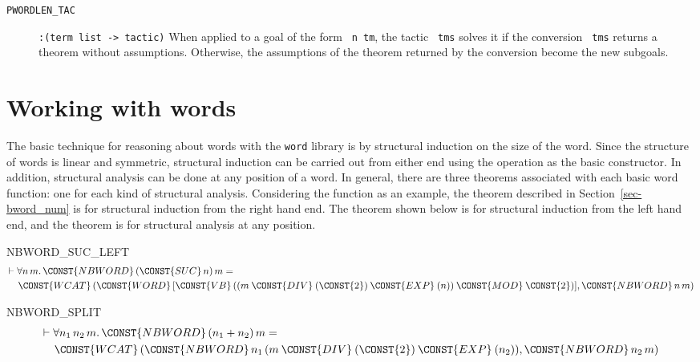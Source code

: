 \begin{description}
\item[{\tt PWORDLEN\_TAC}] \verb|:(term list -> tactic)|
When applied to a goal of the form {\tt{} n tm}, the
tactic {\tt{} tms} solves it if the conversion
{\tt{} tms} returns a theorem without assumptions.
Otherwise, the assumptions of the theorem returned by the conversion
become the new subgoals.
\end{description}

\section{Working with words}

The basic technique for reasoning about words with the {\tt word}
library is by structural induction on the size of the word.
Since the structure of words is linear and symmetric, structural
induction can be carried out from either end using the 
operation as the basic constructor. In addition, structural analysis
can be done at any position of a word. In general, there are three
theorems associated with each basic word function: one for each kind
of structural analysis. Considering the function  as an
example, the theorem 
described in Section~\ref{sec-bword_num} is for structural induction
from the right hand end. The theorem  shown
below is for structural induction from the left hand end, and the
theorem  is for structural analysis at any
position.
\begin{holthm}{NBWORD_SUC_LEFT}
\begin{eqnarray*}
\lefteqn{\THM \FORALL n \,m\DOT
        \CONST{NBWORD} \,(\CONST{SUC} \,n) \,m =}\\
 & & \CONST{WCAT}
              \,(\CONST{WORD}
                    \,[\CONST{VB}
                          \,((m \:\CONST{DIV}\:
                                 ( \CONST{2}
                                   )\:\CONST{EXP}\:( n )) \:\CONST{MOD}\:
                                \CONST{2})],
                 \CONST{NBWORD} \,n \,m)
\end{eqnarray*}
\end{holthm}
\begin{holthm}{NBWORD_SPLIT}
\begin{eqnarray*}
\lefteqn{\THM \FORALL n_{1} \,n_{2} \,m\DOT
        \CONST{NBWORD} \,(n_{1} + n_{2}) \,m =} \\
 & & \CONST{WCAT}
              \,(\CONST{NBWORD} \,n_{1}
                    \,(m \:\CONST{DIV}\:
                          ( \CONST{2} )\:\CONST{EXP}\:( n_{2} )),
                 \CONST{NBWORD} \,n_{2} \,m)
\end{eqnarray*}
\end{holthm}

